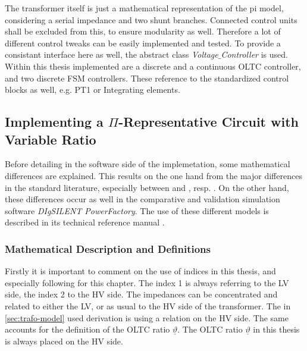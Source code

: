 The transformer itself is just a mathematical representation of the pi model, considering a serial impedance and two shunt branches.
Connected control units shall be excluded from this, to ensure modularity as well. 
Therefore a lot of different control tweaks can be easily implemented and tested.
To provide a consistant interface here as well, the abstract class \textit{Voltage$\_$Controller} is used.
Within this thesis implemented are a discrete and a continuous \acs{OLTC} controller, and two discrete \acs{FSM} controllers.
These reference to the standardized control blocks as well, e.g. PT1 or Integrating elements.

\subsection{Implementing a $\Pi$-Representative Circuit with Variable Ratio}

Before detailing in the software side of the implemetation, some mathematical differences are explained.
This results on the one hand from the major differences in the standard literature, especially between \textcite{machowski_2020} and \textcite{kundur_2022}, resp. \textcite{milano_2010}.
On the other hand, these differences occur as well in the comparative and validation simulation software \textit{DIgSILENT PowerFactory}.
The use of these different models is described in its technical reference manual \quelle. 

\subsubsection{Mathematical Description and Definitions}

Firstly it is important to comment on the use of indices in this thesis, and especially following for this chapter.
The index 1 is always referring to the \acs{LV} side, the index 2 to the \acs{HV} side. 
The impedances can be concentrated and related to either the \acs{LV}, or as usual to the \acs{HV} side of the transformer. 
The in \autoref{sec:trafo-model} used derivation is using a relation on the \acs{HV} side.
The same accounts for the definition of the \acs{OLTC} ratio $\underline{\vartheta}$.     
The \acs{OLTC} ratio $\underline{\vartheta}$ in this thesis is always placed on the HV side.

